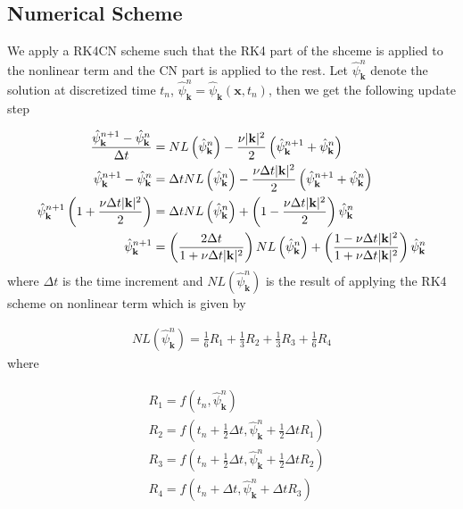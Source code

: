 \documentclass[9pt]{article}
\newcommand{\psihat}[1]{\hat{\psi}_{#1}}      				          %
\newcommand{\bfx}{\mathbf{x}}								%
\newcommand{\bfk}{\mathbf{k}}								%
\begin{document}
\subsection{Numerical Scheme}

We apply a RK4CN scheme such that the RK4 part of the shceme is applied to the nonlinear term and the CN part is applied to the rest. Let $\psihat{\bfk}^n$ denote the solution at discretized time $t_n$, $\psihat{\bfk}^n = \psihat{\bfk}(\bfx, t_n)$, then we get the following update step

\begin{align}
	\frac{\psihat{\bfk}^{n + 1} - \psihat{\bfk}^n}{\Delta t} &= NL\left(\psihat{\bfk}^n\right) - \frac{\nu |\bfk|^2}{2} \left(\psihat{\bfk}^{n + 1} + \psihat{\bfk}^n\right) \notag \\
	\psihat{\bfk}^{n + 1} - \psihat{\bfk}^n &= \Delta t NL\left(\psihat{\bfk}^n\right) - \frac{\nu \Delta t |\bfk|^2}{2} \left(\psihat{\bfk}^{n + 1} + \psihat{\bfk}^n\right) \notag \\
	\psihat{\bfk}^{n + 1}\left(1 + \frac{\nu \Delta t |\bfk|^2}{2}\right) &= \Delta t NL\left(\psihat{\bfk}^n\right) +\left(1 -  \frac{\nu \Delta t |\bfk|^2}{2} \right)  \psihat{\bfk}^n \notag \\
	\psihat{\bfk}^{n + 1} &= \left(\frac{2\Delta t}{1 +\nu \Delta t |\bfk|^2}\right) NL\left(\psihat{\bfk}^n\right) + \left(\frac{1 -  \nu \Delta t |\bfk|^2}{1 +\nu \Delta t |\bfk|^2} \right) \psihat{\bfk}^n 
\end{align}
where $\Delta t$ is the time increment and $NL\left(\psihat{\bfk}^n\right)$ is the result of applying the RK4 scheme on nonlinear term which is given by

\begin{align}
NL\left(\psihat{\bfk}^n\right) =\frac{1}{6} R_{1}+\frac{1}{3} R_{2}+\frac{1}{3} R_{3}+\frac{1}{6} R_{4}
\end{align}
where

\begin{align}
	\begin{aligned}
	&R_{1}=f\left(t_{n}, \hat{\psi}_{\mathbf{k}}^{n}\right) \\
	&R_{2}=f\left(t_{n}+\frac{1}{2} \Delta t, \hat{\psi}_{\mathbf{k}}^{n}+\frac{1}{2} \Delta t R_{1}\right) \\
	&R_{3}=f\left(t_{n}+\frac{1}{2} \Delta t, \hat{\psi}_{\mathbf{k}}^{n}+\frac{1}{2} \Delta t R_{2}\right) \\
	&R_{4}=f\left(t_{n}+\Delta t, \hat{\psi}_{\mathbf{k}}^{n}+\Delta t R_{3}\right)
	\end{aligned}
\end{align}
\end{document}
